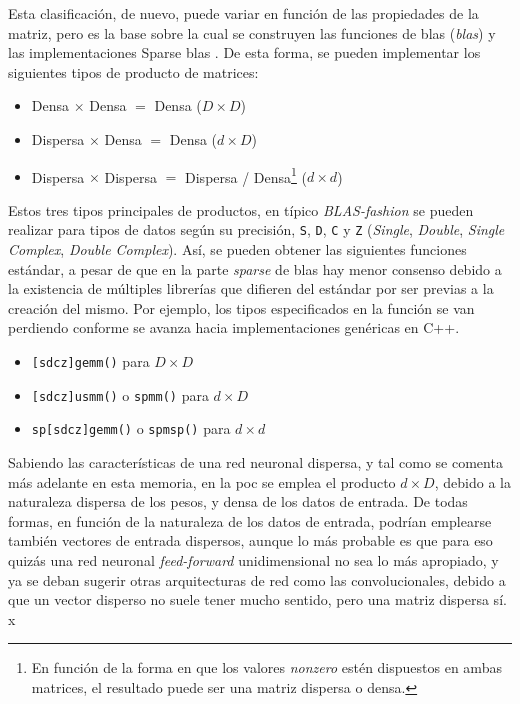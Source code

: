 Esta clasificación, de nuevo, puede variar en función de las propiedades de la matriz, pero es la base sobre la cual se construyen las funciones de \acrshort{blas} (\textit{\acrlong{blas}}) \cite{netlib_blas} y las implementaciones Sparse \acrshort{blas} \cite{sparse_blas_10.1145/567806.567810}. De esta forma, se pueden implementar los siguientes tipos de producto de matrices:

\begin{itemize}
    \item Densa $\times$ Densa $=$ Densa ($D\times D$)
    \item Dispersa $\times$ Densa $=$ Densa ($d\times D$)
    \item Dispersa $\times$ Dispersa $=$ Dispersa / Densa\footnote{En función de la forma en que los valores \textit{nonzero} estén dispuestos en ambas matrices, el resultado puede ser una matriz dispersa o densa.} ($d\times d$)
\end{itemize}

Estos tres tipos principales de productos, en típico \textit{BLAS-fashion} se pueden realizar para tipos de datos según su precisión, \texttt{S}, \texttt{D}, \texttt{C} y \texttt{Z} (\textit{Single}, \textit{Double}, \textit{Single Complex}, \textit{Double Complex}).
Así, se pueden obtener las siguientes funciones estándar, a pesar de que en la parte \textit{sparse} de \acrshort{blas} hay menor consenso debido a la existencia de múltiples librerías que difieren del estándar por ser previas a la creación del mismo. Por ejemplo, los tipos especificados en la función se van perdiendo conforme se avanza hacia implementaciones genéricas en C++.

\begin{itemize}
    \item \texttt{[sdcz]gemm()} para $D\times D$
    \item \texttt{[sdcz]usmm()} o \texttt{spmm()} para $d\times D$
    \item \texttt{sp[sdcz]gemm()} o \texttt{spmsp()} para $d\times d$
\end{itemize}

Sabiendo las características de una red neuronal dispersa, y tal como se comenta más adelante en esta memoria, en la \acrshort{poc} se emplea el producto $d\times D$, debido a la naturaleza dispersa de los pesos, y densa de los datos de entrada. De todas formas, en función de la naturaleza de los datos de entrada, podrían emplearse también vectores de entrada dispersos, aunque lo más probable es que para eso quizás una red neuronal \textit{feed-forward} unidimensional no sea lo más apropiado, y ya se deban sugerir otras arquitecturas de red como las convolucionales, debido a que un vector disperso no suele tener mucho sentido, pero una matriz dispersa sí.
x
